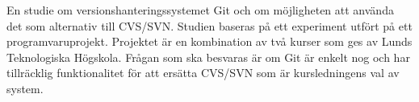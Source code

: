 En studie om versionshanteringssystemet Git och om möjligheten att använda det som alternativ till CVS/SVN. Studien baseras på ett experiment utfört på ett programvaruprojekt. Projektet är en kombination av två kurser som ges av Lunds Teknologiska Högskola. Frågan som ska besvaras är om Git är enkelt nog och har tillräcklig funktionalitet för att ersätta CVS/SVN som är kursledningens val av system.